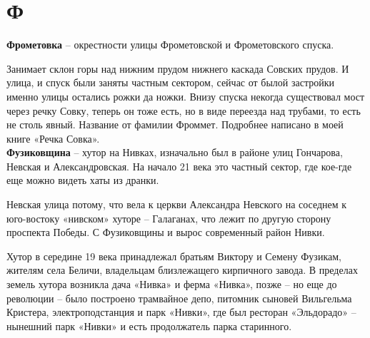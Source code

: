 \chapter*{Ф}

\textbf{Фрометовка} – окрестности улицы Фрометовской и Фрометовского спуска.

Занимает склон горы над нижним прудом нижнего каскада Совских прудов. И улица, и спуск были заняты частным сектором, сейчас от былой застройки именно улицы остались рожки да ножки. Внизу спуска некогда существовал мост через речку Совку, теперь он тоже есть, но в виде переезда над трубами, то есть не столь явный. Название от фамилии Фроммет. Подробнее написано в моей книге «Речка Совка».\\

\textbf{Фузиковщина} – хутор на Нивках, изначально был в районе улиц Гончарова, Невская и Александровская. На начало 21 века это частный сектор, где кое-где еще можно видеть хаты из дранки.

Невская улица потому, что вела к церкви Александра Невского на соседнем к юго-востоку «нивском» хуторе – Галаганах, что лежит по другую сторону проспекта Победы. С Фузиковщины и вырос современный район Нивки.

Хутор в середине 19 века принадлежал братьям Виктору и Семену Фузикам, жителям села Беличи, владельцам близлежащего кирпичного завода. В пределах земель хутора возникла дача «Нивка» и ферма «Нивка», позже – но еще до революции – было построено трамвайное депо, питомник сыновей Вильгельма Кристера, электроподстанция и парк «Нивки», где был ресторан «Эльдорадо» – нынешний парк «Нивки» и есть продолжатель парка старинного.

